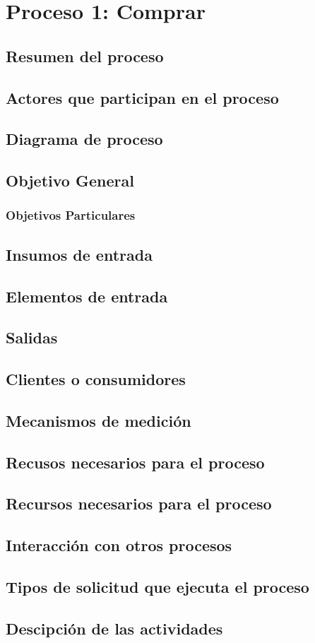 \hypertarget{procesoCompra}{}
\section{Proceso 1: Comprar}
\subsection{Resumen del proceso}
\subsection{Actores que participan en el proceso}
\subsection{Diagrama de proceso}
\subsection{Objetivo General}
\subsubsection{Objetivos Particulares}
\subsection{Insumos de entrada}
\subsection{Elementos de entrada}
\subsection{Salidas}
\subsection{Clientes o consumidores}
\subsection{Mecanismos de medici\'on}
\subsection{Recusos necesarios para el proceso}
\subsection{Recursos necesarios para el proceso}
\subsection{Interacci\'on con otros procesos}
\subsection{Tipos de solicitud que ejecuta el proceso}
\subsection{Descipci\'on de las actividades}
